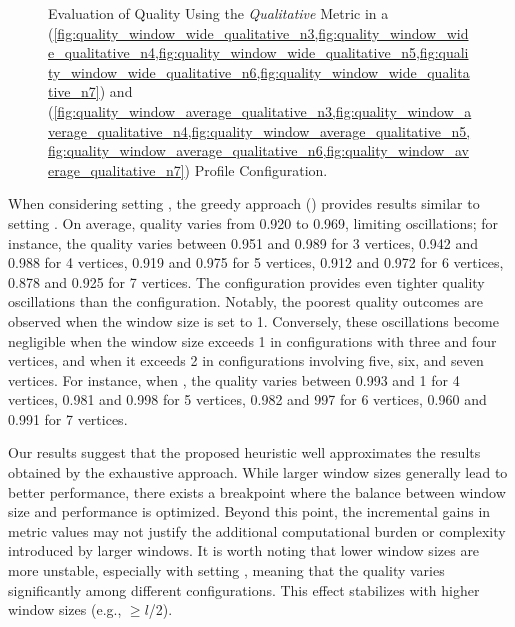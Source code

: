 \begin{figure}[H]
\begin{adjustbox}{minipage=\linewidth,scale=0.75}
\begin{subfigure}{0.45\textwidth}
      \end{subfigure}

    \caption{Evaluation of Quality Using the \emph{Qualitative} Metric in a \wide (\cref{fig:quality_window_wide_qualitative_n3,fig:quality_window_wide_qualitative_n4,fig:quality_window_wide_qualitative_n5,fig:quality_window_wide_qualitative_n6,fig:quality_window_wide_qualitative_n7}) and \average (\cref{fig:quality_window_average_qualitative_n3,fig:quality_window_average_qualitative_n4,fig:quality_window_average_qualitative_n5,fig:quality_window_average_qualitative_n6,fig:quality_window_average_qualitative_n7}) Profile Configuration.}  \label{fig:quality_window_qualitative}
  \end{adjustbox}
  \end{figure}

  When considering setting \average, the greedy approach () provides results similar to setting \wide. On average, quality varies from 0.920 to 0.969, limiting oscillations; for instance, the quality varies between 0.951 and 0.989 for 3 vertices, 0.942 and 0.988 for 4 vertices, 0.919 and 0.975 for 5 vertices, 0.912 and 0.972 for 6 vertices, 0.878 and 0.925 for 7 vertices. The \average configuration provides even tighter quality oscillations than the \wide configuration. Notably, the poorest quality outcomes are observed when the window size is set to 1. Conversely, these oscillations become negligible when the window size exceeds 1 in configurations with three and four vertices, and when it exceeds 2 in configurations involving five, six, and seven vertices.  For instance, when , the quality varies between  0.993 and 1 for 4 vertices, 0.981 and 0.998 for 5 vertices, 0.982 and 997 for 6 vertices, 0.960 and 0.991 for 7 vertices.

  Our results suggest that the proposed heuristic well approximates the results obtained by the exhaustive approach. While larger window sizes generally lead to better performance, there exists a breakpoint where the balance between window size and performance is optimized. Beyond this point, the incremental gains in metric values may not justify the additional computational burden or complexity introduced by larger windows. It is worth noting that lower window sizes are more unstable, especially with setting \wide, meaning that the quality varies significantly among different configurations. This effect stabilizes with higher window sizes (e.g., \windowsize$\geq$$l$/2).
  



